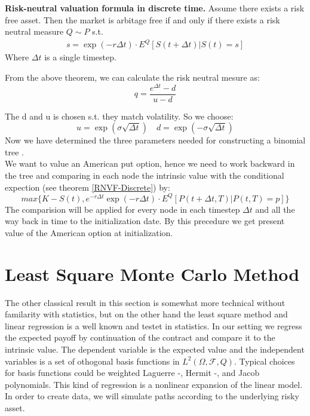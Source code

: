 \begin{theorem}\label{RNVF-Discrete}
\textbf{Risk-neutral valuation formula in discrete time. }
Assume there exists a risk free asset. Then the market is arbitage free if and only if there exists a risk neutral measure $Q \sim P$ s.t.
\begin{align}
s= \exp(- r \Delta t) \cdot E^Q[S(t+\Delta t)|S(t)=s] 
\end{align}
Where $\Delta t$ is a single timestep.
\end{theorem}
From the above theorem, we can calculate the risk neutral mesure as:\\
$$q=\frac{e^{\Delta t}-d}{u-d}$$

The d and u is chosen s.t. they match volatility. So we choose:
$$u= \exp(\sigma \sqrt{\Delta t}) \quad d= \exp(-\sigma \sqrt{\Delta t})$$
Now we have determined the three parameters needed for constructing a binomial tree \parencite{binomial-Paper} \parencite{Hull} \parencite{finKont}.\\

We want to value an American put option, hence we need to work backward in the tree and comparing in each node the intrinsic value with the conditional expection (see theorem \ref{RNVF-Discrete}) by:
\begin{equation}
max\{ K-S(t), e^{-r \Delta t} \exp(- r \Delta t) \cdot E^Q[P(t+\Delta t,T)|P(t,T)=p] \}
\end{equation}
The comparision will be applied for every node in each timestep $\Delta t$  and all the way back in time to the initialization date. By this precedure we get present value of the American option at initialization.




\section{Least Square Monte Carlo Method}
The other classical result in this section is somewhat more technical without familarity with statistics, but on the other hand the least square method and linear regression is a well known and testet in statistics. In our setting we regress the expected payoff by continuation of the contract and compare it to the intrinsic value. The dependent variable is the expected value and the independent variables is a set of othogonal basis functions in $L^2(\Omega, \mathcal{F}, Q)$. Typical choices for basis functions could be weighted Laguerre -, Hermit -, and Jacob polynomials. This kind of regression is a nonlinear expansion of the linear model. In order to create data, we will simulate paths according to the underlying risky asset. 

